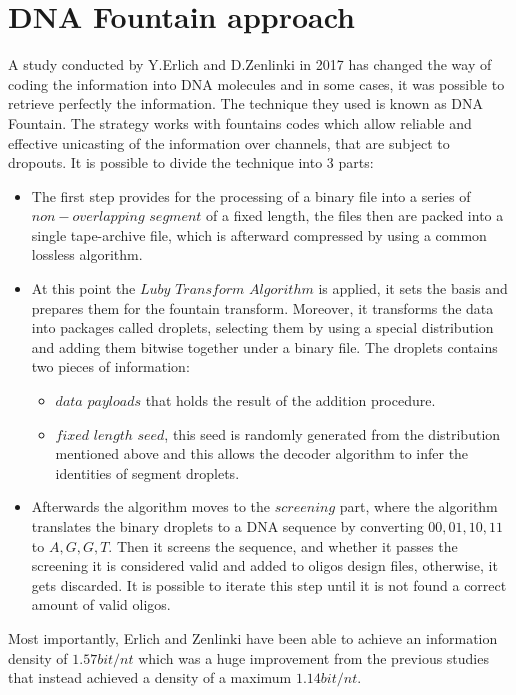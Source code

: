 \documentclass[10pt,twocolumn,twoside]{gsajnl}
\begin{document}
\section{DNA Fountain approach}
A study conducted by Y.Erlich and D.Zenlinki in 2017 has changed the way of coding the information into DNA molecules and in some cases, it was possible to retrieve perfectly the information.
The technique they used is known as DNA Fountain. 
The strategy works with fountains codes which allow reliable and effective unicasting of the information over channels, that are subject to dropouts.
It is possible to divide the technique into 3 parts:
\begin{itemize}
    \item The first step provides for the processing of a binary file into a series of $non-overlapping$ $segment$ of a fixed length, the files then are packed into a single tape-archive file, which is afterward compressed by using a common lossless algorithm. 
    
    \item At this point the $Luby$ $Transform$ $Algorithm$ is applied, it sets the basis and prepares them for the fountain transform. Moreover, it transforms the data into packages called droplets, selecting them by using a special distribution and adding them bitwise together under a binary file.
    The droplets contains two pieces of information:
    
    \begin{itemize}
        \item $data$ $payloads$ that holds the result of the addition procedure.
        
        \item $fixed$ $length$ $seed$, this seed is randomly generated from the distribution mentioned above and this allows the decoder algorithm to infer the identities of segment droplets.
    \end{itemize}
    
    \item Afterwards the algorithm moves to the $screening$ part, where the algorithm translates the binary droplets to a DNA sequence by converting ${00, 01 , 10, 11}$ to ${A, G , G , T}$. Then it screens the sequence, and whether it passes the screening it is considered valid and added to oligos design files, otherwise, it gets discarded.
    It is possible to iterate this step until it is not found a correct amount of valid oligos. 
\end{itemize}
Most importantly, Erlich and Zenlinki have been able to achieve an information density of $1.57bit/nt$ which was a huge improvement from the previous studies that instead achieved a density of a maximum $1.14bit/nt$.
\end{document}
